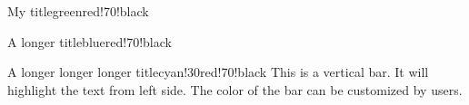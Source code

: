 \documentclass{article}
\newenvironment{cbcurvedtitle}[3]
    {\begin{cbcurvedbox}{#1}{#2}{#3} }
    {\end{cbcurvedbox}}
\begin{document}
\begin{cbcurvedbox}{My title}{green}{red!70!black}
\lipsum[2]
\end{cbcurvedbox}

\begin{cbcurvedbox}{A longer title}{blue}{red!70!black}
\lipsum[2]
\end{cbcurvedbox}

\begin{cbcurvedtitle}{A longer longer longer title}{cyan!30}{red!70!black}
    This is a vertical bar.
    It will highlight the text from left side.
    The color of the bar can be customized by users.
\end{cbcurvedtitle}
\end{document}
